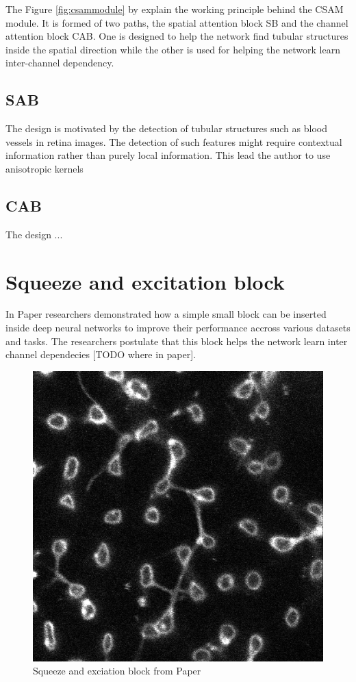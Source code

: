 \documentclass[
  digital,     %
  oneside,     %
  nosansbold,  %
  nocolorbold, %
  lof,         %
  lot,         %
]{fithesis4}
\begin{document}
The Figure \ref{fig:csammodule} by \parencite{Mou2021} explain the working
principle behind the CSAM module. It is formed of two paths, the spatial
attention block SB and the channel attention block CAB. One is designed to help
the network find tubular structures inside the spatial direction while the other
is used for helping the network learn inter-channel dependency.

\subsection*{SAB}
The design is motivated by the detection of tubular structures such as blood
vessels in retina images. The detection of such features might require
contextual information rather than purely local information. This lead the
author to use anisotropic kernels 

\subsection*{CAB}
The design ...



\section{Squeeze and excitation block}
In Paper \parencite{Hu2018} researchers demonstrated how a simple small block
can be inserted inside deep neural networks to improve their performance accross
various datasets and tasks. The researchers postulate that this block helps the
network learn inter channel dependecies [TODO where in paper].

\begin{figure}
    \begin{center}
        \includegraphics[width=0.6\linewidth]{resources/t017z0_saturated1percent.png}
    \end{center}
    \caption{Squeeze and exciation block from Paper \parencite{Hu2018}}
    \label{fig:se_diagram}
\end{figure}
\end{document}
